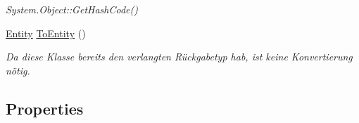 \begin{CompactItemize}
\begin{CompactList}\small\item\em System.Object::Get\-Hash\-Code() \item\end{CompactList}\item 
\hyperlink{classmy_m_d_1_1_model_1_1_data_model_1_1_entity}{Entity} \hyperlink{classmy_m_d_1_1_model_1_1_data_model_1_1_entity_1a8b26c73ec083d6930f1f39ce916df3}{To\-Entity} ()
\begin{CompactList}\small\item\em Da diese Klasse bereits den verlangten R\"{u}ckgabetyp hab, ist keine Konvertierung n\"{o}tig. \item\end{CompactList}\end{CompactItemize}
\subsection*{Properties}
